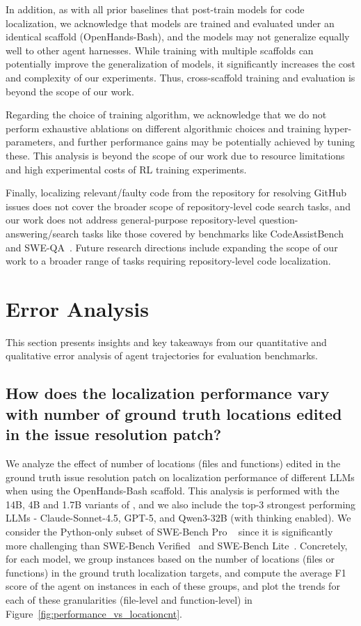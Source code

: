 In addition, as with all prior baselines that post-train models for code localization, we acknowledge that \methodname models are trained and evaluated under an identical scaffold (OpenHands-Bash), and the models may not generalize equally well to other agent harnesses. While training with multiple scaffolds can potentially improve the generalization of \methodname models, it significantly increases the cost and complexity of our experiments. Thus, cross-scaffold training and evaluation is beyond the scope of our work.

Regarding the choice of training algorithm, we acknowledge that we do not perform exhaustive ablations on different algorithmic choices and training hyper-parameters, and further performance gains may be potentially achieved by tuning these. This analysis is beyond the scope of our work due to resource limitations and high experimental costs of RL training experiments.  

Finally, localizing relevant/faulty code from the repository for resolving GitHub issues does not cover the broader scope of repository-level code search tasks, and our work does not address general-purpose repository-level question-answering/search tasks like those covered by benchmarks like CodeAssistBench~\citep{kim2026codeassistbenchcabdataset} and SWE-QA~\citep{peng2025sweqalanguagemodelsanswer}. Future research directions include expanding the scope of our work to a broader range of tasks requiring repository-level code localization.

\section{Error Analysis}\label{appendix:error_analysis}
This section presents insights and key takeaways from our quantitative and qualitative error analysis of agent trajectories for evaluation benchmarks.

\subsection{How does the localization performance vary with number of ground truth locations edited in the issue resolution patch?}
We analyze the effect of number of locations (files and functions) edited in the ground truth issue resolution patch on localization performance of different LLMs when using the OpenHands-Bash scaffold. This analysis is performed with the 14B, 4B and 1.7B variants of \methodname, and we also include the top-3 strongest performing LLMs - Claude-Sonnet-4.5, GPT-5, and Qwen3-32B (with thinking enabled). We consider the Python-only subset of SWE-Bench Pro ~\citep{deng2025swebenchproaiagents} since it is significantly more challenging than SWE-Bench Verified~\citep{chowdhury2024swebenchverified} and SWE-Bench Lite~\citep{jimenez2024swebenchlanguagemodelsresolve}. Concretely, for each model, we group instances based on the number of locations (files or functions) in the ground truth localization targets, and compute the average F1 score of the agent on instances in each of these groups, and plot the trends for each of these granularities (file-level and function-level) in Figure~\ref{fig:performance_vs_locationcnt}.

